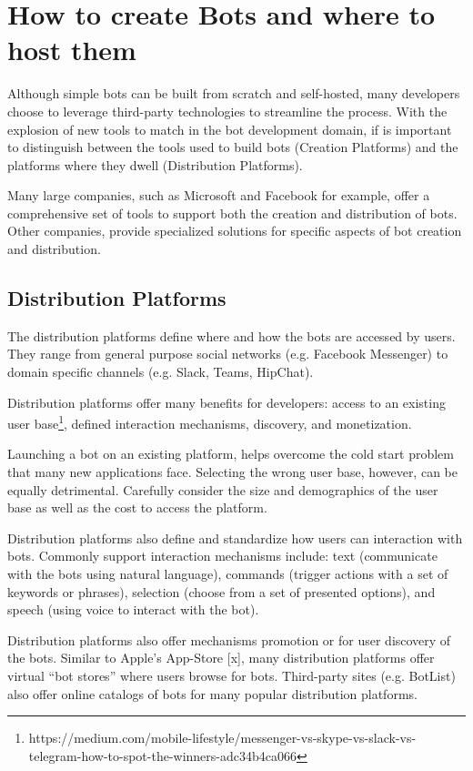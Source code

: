 \documentclass{sig-alternate}
\begin{document}
	
\section{How to create Bots and where to host them}

	Although simple bots can be built from scratch and self-hosted, many developers choose to leverage third-party technologies to streamline the process. With the explosion of new tools to match in the bot development domain, if is important to distinguish between the tools used to build bots (Creation Platforms) and the platforms where they dwell (Distribution Platforms).

	Many large companies, such as Microsoft and Facebook for example, offer a comprehensive set of tools to support both the creation and distribution of bots. Other companies, provide specialized solutions for specific aspects of bot creation and distribution. 

	\subsection{Distribution Platforms}
	The distribution platforms define where and how the bots are accessed by users. They range from general purpose social networks (e.g. Facebook Messenger) to domain specific channels (e.g. Slack, Teams, HipChat).  

	Distribution platforms offer many benefits for developers: access to an existing user base\footnote{https://medium.com/mobile-lifestyle/messenger-vs-skype-vs-slack-vs-telegram-how-to-spot-the-winners-adc34b4ca066\label{How_to_spot_the_winners}}, defined interaction mechanisms, discovery, and monetization.  

	Launching a bot on an existing platform, helps overcome the cold start problem that many new applications face. Selecting the wrong user base, however, can be equally detrimental. Carefully consider the size and demographics of the user base as well as the cost to access the platform. 

	Distribution platforms also define and standardize how users can interaction with bots.  Commonly support interaction mechanisms include: text (communicate with the bots using natural language), commands (trigger actions with a set of keywords or phrases), selection (choose from a set of presented options), and speech (using voice to interact with the bot).

	Distribution platforms also offer mechanisms promotion or for user discovery of the bots. Similar to Apple's App-Store [x], many distribution platforms offer virtual ``bot stores'' where users browse for bots. Third-party sites (e.g. BotList) also offer online catalogs of bots for many popular distribution platforms. 
\end{document}
